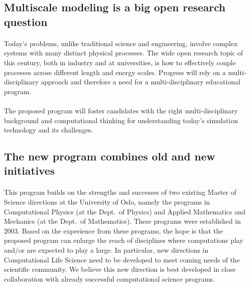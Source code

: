 \documentclass[%
oneside,                 %
final,                   %
10pt]{article}
\begin{document}
\subsection{Multiscale modeling is a big open research question}


\paragraph{}
Today's problems, unlike traditional
science and engineering, involve complex systems with many distinct
physical processes. The wide open research topic of this century, both
in industry and at universities, is how to effectively couple
processes across different length and energy scales. Progress will
rely on a multi-disciplinary approach and therefore a need for
a multi-disciplinary educational program.




\paragraph{}
The proposed program will foster candidates with the right
multi-disciplinary background and computational thinking for
understanding today's simulation technology and its challenges.



\subsection{The new program combines old and new initiatives}

\paragraph{}

This program builds on the strengths and successes of two existing Master of Science directions at the University of Oslo, namely the 
programs in Computational Physics (at the Dept.~of Physics) and
Applied Mathematics and Mechanics (at the Dept.~of Mathematics).
These programs were established in 2003.
Based on the experience from these programs, the hope is that the proposed program can enlarge the reach of disciplines where computations play and/or are expected to play  a large. In particular, new directions 
in Computational Life Science need to  be developed to
meet coming needs of the scientific community. We believe this new direction is
best developed in close collaboration with already successful
computational science programs.
\end{document}
